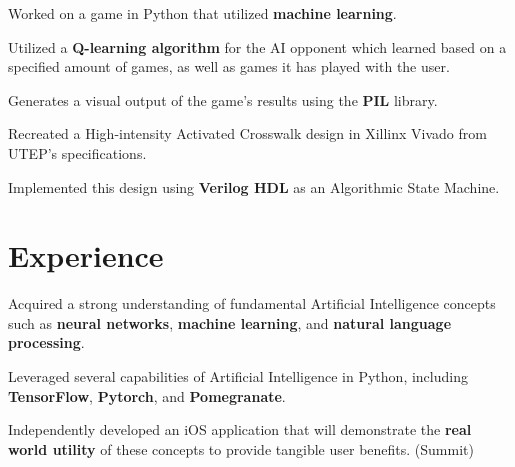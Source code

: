 \documentclass[letterpaper,10pt]{article}
\begin{document}
\vspace{0pt}
\begin{resume_list}
  \item Worked on a game in Python that utilized \textbf{machine learning}.
  \vspace{1pt}
  \item Utilized a \textbf{Q-learning algorithm} for the AI opponent which learned based on a specified amount of games, as well as games it has played with the user.
  \vspace{1pt}
  \item Generates a visual output of the game's results using the \textbf{PIL} library.
\end{resume_list}

\vspace{0pt}
\begin{resume_list}
  \item Recreated a High-intensity Activated Crosswalk design in Xillinx Vivado from UTEP's specifications.
  \vspace{1pt}
  \item Implemented this design using \textbf{Verilog HDL} as an Algorithmic State Machine.
\end{resume_list}


\vspace{0pt}
  \section{Experience}

\begin{resume_list}
  \item Acquired a strong understanding of fundamental Artificial Intelligence concepts such as \textbf{neural networks}, \textbf{machine learning}, and \textbf{natural language processing}.
  \vspace{1pt}
  \item Leveraged several capabilities of Artificial Intelligence in Python, including \textbf{TensorFlow}, \textbf{Pytorch}, and \textbf{Pomegranate}.
  \vspace{1pt}
  \item Independently developed an iOS application that will demonstrate the \textbf{real world utility} of these concepts to provide tangible user benefits. (Summit)
  \vspace{2pt}
\end{resume_list}
\end{document}
